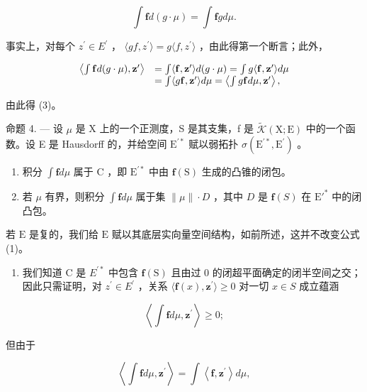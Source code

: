 \[
\int \mathbf {f} d (g \cdot \mu) = \int \mathbf {f} g d \mu .\tag{3}
\]

事实上，对每个 \(z^{\prime} \in E^{\prime}\) ， \(\langle gf, z^{\prime} \rangle = g\langle f, z^{\prime} \rangle\) ，由此得第一个断言；此外，

\[
\begin{array}{r l} \left\langle \int \mathbf {f} d (g \cdot \mu), \mathbf {z} ^ {\prime} \right\rangle & = \int \langle \mathbf {f}, \mathbf {z} ^ {\prime} \rangle d (g \cdot \mu) = \int g \langle \mathbf {f}, \mathbf {z} ^ {\prime} \rangle d \mu \\ & = \int \langle g \mathbf {f}, \mathbf {z} ^ {\prime} \rangle d \mu = \left\langle \int g \mathbf {f} d \mu , \mathbf {z} ^ {\prime} \right\rangle , \end{array}
\]

由此得 (3)。

命题 4. --- 设 \(\mu\) 是 X 上的一个正测度，S 是其支集，f 是 \(\widetilde{\mathcal{K}}(\mathrm{X};\mathrm{E})\) 中的一个函数。设 E 是 Hausdorff 的，并给空间 \(\mathrm{E}^{\prime*}\) 赋以弱拓扑 \(\sigma(\mathrm{E}^{\prime*},\mathrm{E}^{\prime})\) 。

\begin{enumerate}
\def\labelenumi{(\roman{enumi})}
\item
  积分 \(\int \mathbf{f}d\mu\) 属于 C ，即 \(\mathrm{E}^{\prime *}\) 中由 \(\mathbf{f}(\mathrm{S})\) 生成的凸锥的闭包。
\item
  若 \(\mu\) 有界，则积分 \(\int \mathbf{f} d\mu\) 属于集 \(\| \mu \| \cdot D\) ，其中 \(D\) 是 \(\mathbf{f}(S)\) 在 \(\mathrm{E}'^*\) 中的闭凸包。
\end{enumerate}

若 \(\mathrm{E}\) 是复的，我们给 \(\mathrm{E}\) 赋以其底层实向量空间结构，如前所述，这并不改变公式 (1)。

\begin{enumerate}
\def\labelenumi{(\roman{enumi})}
\tightlist
\item
  我们知道 C 是 \(E^{\prime*}\) 中包含 \(\mathbf{f}(\mathrm{S})\) 且由过 0 的闭超平面确定的闭半空间之交；因此只需证明，对 \(z^{\prime} \in E^{\prime}\) ，关系 \(\langle\mathbf{f}(x), \mathbf{z}^{\prime}\rangle \geqslant 0\) 对一切 \(x \in S\) 成立蕴涵
\end{enumerate}

\[
\left\langle \int \mathbf {f} d \mu , \mathbf {z} ^ {\prime} \right\rangle \geqslant 0;
\]

但由于

\[
\left\langle \int \mathbf {f} d \mu , \mathbf {z} ^ {\prime} \right\rangle = \int \left\langle \mathbf {f}, \mathbf {z} ^ {\prime} \right\rangle d \mu ,
\]

